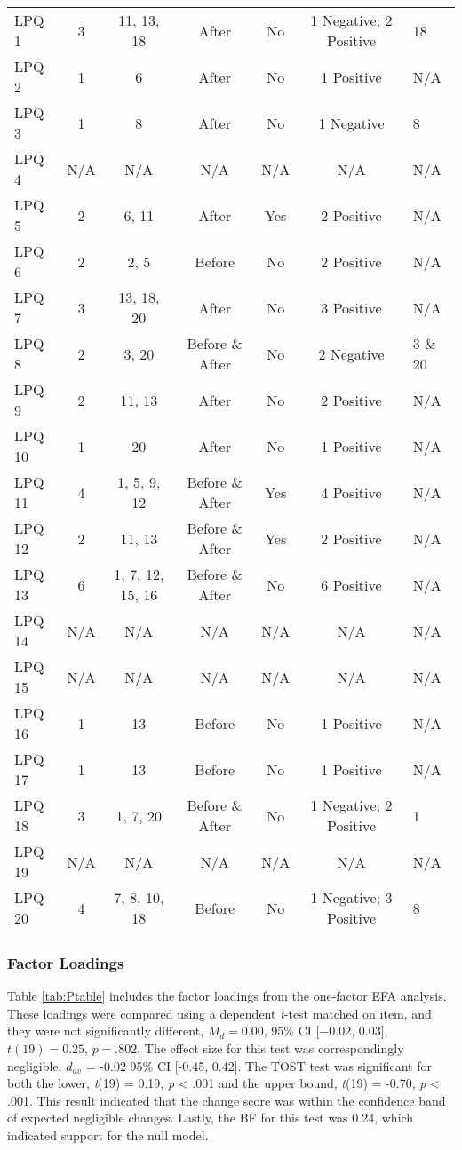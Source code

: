 \documentclass[english,man, mask]{apa6}
\theoremstyle{definition}
\theoremstyle{definition}
\theoremstyle{definition}
\theoremstyle{remark}
\begin{document}
\begin{table}[tbp]
\begin{center}
\begin{threeparttable}
\begin{tabular}{lcccccl}
LPQ 1 & 3 & 11, 13, 18 & After & No & 1 Negative; 2 Positive & 18\\
LPQ 2 & 1 & 6 & After & No & 1 Positive & N/A\\
LPQ 3 & 1 & 8 & After & No & 1 Negative & 8\\
LPQ 4 & N/A & N/A & N/A & N/A & N/A & N/A\\
LPQ 5 & 2 & 6, 11 & After & Yes & 2 Positive & N/A\\
LPQ 6 & 2 & 2, 5 & Before & No & 2 Positive & N/A\\
LPQ 7 & 3 & 13, 18, 20 & After & No & 3 Positive & N/A\\
LPQ 8 & 2 & 3, 20 & Before \& After & No & 2 Negative & 3 \& 20\\
LPQ 9 & 2 & 11, 13 & After & No & 2 Positive & N/A\\
LPQ 10 & 1 & 20 & After & No & 1 Positive & N/A\\
LPQ 11 & 4 & 1, 5, 9, 12 & Before \& After & Yes & 4 Positive & N/A\\
LPQ 12 & 2 & 11, 13 & Before \& After & Yes & 2 Positive & N/A\\
LPQ 13 & 6 & 1, 7, 12, 15, 16 & Before \& After & No & 6 Positive & N/A\\
LPQ 14 & N/A & N/A & N/A & N/A & N/A & N/A\\
LPQ 15 & N/A & N/A & N/A & N/A & N/A & N/A\\
LPQ 16 & 1 & 13 & Before & No & 1 Positive & N/A\\
LPQ 17 & 1 & 13 & Before & No & 1 Positive & N/A\\
LPQ 18 & 3 & 1, 7, 20 & Before \& After & No & 1 Negative; 2 Positive & 1\\
LPQ 19 & N/A & N/A & N/A & N/A & N/A & N/A\\
LPQ 20 & 4 & 7, 8, 10, 18 & Before & No & 1 Negative; 3 Positive & 8\\
\bottomrule
\end{tabular}
\end{threeparttable}
\end{center}
\end{table}

\subsubsection{Factor Loadings}\label{factor-loadings}

Table \ref{tab:Ptable} includes the factor loadings from the one-factor
EFA analysis. These loadings were compared using a dependent
\emph{t}-test matched on item, and they were not significantly
different, \(M_d = 0.00\), 95\% CI \([-0.02\), \(0.03]\),
\(t(19) = 0.25\), \(p = .802\). The effect size for this test was
correspondingly negligible, \(d_{av}\) = -0.02 95\% CI {[}-0.45,
0.42{]}. The TOST test was significant for both the lower, \emph{t}(19)
= 0.19, \emph{p} \textless{} .001 and the upper bound, \emph{t}(19) =
-0.70, \emph{p} \textless{} .001. This result indicated that the change
score was within the confidence band of expected negligible changes.
Lastly, the BF for this test was 0.24, which indicated support for the
null model.
\end{document}

